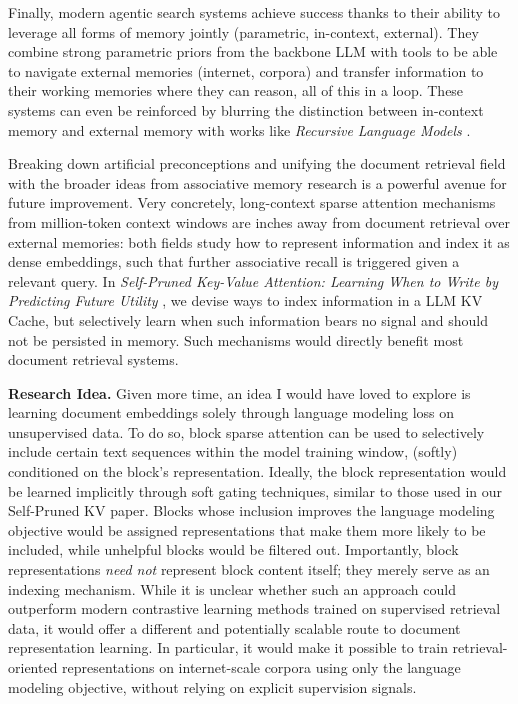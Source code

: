 Finally, modern agentic search systems achieve success thanks to their ability to leverage all forms of memory jointly (parametric, in-context, external).
They combine strong parametric priors from the backbone LLM with tools to be able to navigate external memories (internet, corpora) and transfer information to their working memories where they can reason, all of this in a loop.
These systems can even be reinforced by blurring the distinction between in-context memory and external memory with works like \emph{Recursive Language Models} .

Breaking down artificial preconceptions and unifying the document retrieval field with the broader ideas from associative memory research is a powerful avenue for future improvement. Very concretely, long-context sparse attention mechanisms from million-token context windows are inches away from document retrieval over external memories: both fields study how to represent information and index it as dense embeddings, such that further associative recall is triggered given a relevant query. In \emph{Self-Pruned Key-Value Attention: Learning When to Write by Predicting Future Utility} , we devise ways to index information in a LLM KV Cache, but selectively learn when such information bears no signal and should not be persisted in memory. Such mechanisms would directly benefit most document retrieval systems.

\noindent\textbf{Research Idea.} Given more time, an idea I would have loved to explore is learning document embeddings solely through language modeling loss on unsupervised data. To do so, block sparse attention can be used to selectively include certain text sequences within the model training window, (softly) conditioned on the block's representation. Ideally, the block representation would be learned implicitly through soft gating techniques, similar to those used in our Self-Pruned KV paper. Blocks whose inclusion improves the language modeling objective would be assigned representations that make them more likely to be included, while unhelpful blocks would be filtered out. Importantly, block representations \emph{need not} represent block content itself; they merely serve as an indexing mechanism. While it is unclear whether such an approach could outperform modern contrastive learning methods trained on supervised retrieval data, it would offer a different and potentially scalable route to document representation learning. In particular, it would make it possible to train retrieval-oriented representations on internet-scale corpora using only the language modeling objective, without relying on explicit supervision signals.




